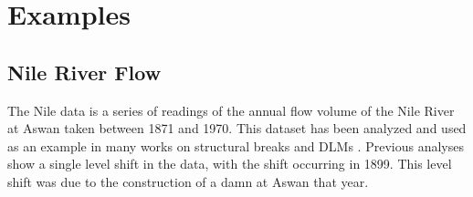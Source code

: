 \documentclass{article}
\begin{document}
\section{Examples}
\label{sec:examples}


\subsection{Nile River Flow}
\label{sec:nile}

The Nile data is a series of readings of the annual flow volume of the Nile River at Aswan taken between 1871 and 1970.
This dataset has been analyzed and used as an example in many works on structural breaks and DLMs \parencites{Cobb1978}{Balke1993}{JongPenzer1998}{DurbinKoopman2001}{DurbinKoopman2012}.
Previous analyses show a single level shift in the data, with the shift occurring in 1899.
This level shift was due to the construction of a damn at Aswan that year.
\end{document}
